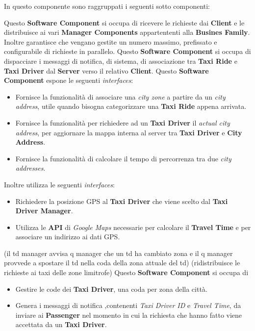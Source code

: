 \begin{itemize}
	In questo componente sono raggruppati i seguenti sotto componenti:
	\begin{itemize}
		 Questo \textbf{Software Component} si occupa di ricevere le richieste dai \textbf{Client} e le distribuisce ai vari \textbf{Manager Components} appartententi alla \textbf{Busines Family}. 
		Inoltre garantisce che vengano gestite un numero massimo, prefissato e configurabile di richieste in parallelo.
		 Questo \textbf{Software Component} si occupa di dispacciare i messaggi di notifica, di sistema, di associazione tra \textbf{Taxi Ride} e \textbf{Taxi Driver} dal \textbf{Server} verso il relativo \textbf{Client}.
		 Questo \textbf{Software Component} espone le seguenti \textit{interfaces}:
		\begin{itemize}
			\item Fornisce la funzionalità di associare una \textit{city zone} a partire da un \textit{city address}, utile quando bisogna categorizzare una \textbf{Taxi Ride} appena arrivata.
			\item Fornisce la funzionalità per richiedere ad un \textbf{Taxi Driver} il \textit{actual city address}, per aggiornare la mappa interna al server tra \textbf{Taxi Driver} e \textbf{City Address}.
			\item Fornisce la funzionalità di calcolare il tempo di percorrenza tra due \textit{city addresses}.
		\end{itemize}
		Inoltre utilizza le seguenti \textit{interfaces}:
		\begin{itemize}
			\item Richiedere la posizione GPS al \textbf{Taxi Driver} che viene scelto dal \textbf{Taxi Driver Manager}.
			\item Utilizza le \textbf{API} di \textit{Google Maps} necessarie per calcolare il \textbf{Travel Time} e per associare un indirizzo ai dati GPS.	
		\end{itemize}
		 (il td manager avvisa q manager che un td ha cambiato zona e il q manager provvede a spostare il td nella coda della zona attuale del td) (ridistribuisce le richieste ai taxi delle zone limitrofe)
		 Questo \textbf{Software Component} si occupa di 
		\begin{itemize}
			\item Gestire le code dei \textbf{Taxi Driver}, una coda per zona della città.
			\item Genera i messaggi di notifica ,contenenti \textit{Taxi Driver ID} e \textit{Travel Time}, da inviare ai \textbf{Passenger} nel momento in cui la richiesta che hanno fatto viene accettata da un \textbf{Taxi Driver}. 

\end{itemize}
\end{itemize}
\end{itemize}
